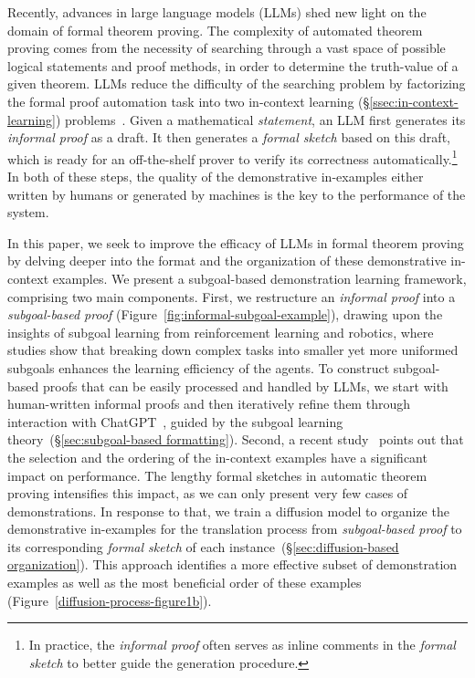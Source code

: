 \documentclass{article}
\begin{document}
Recently, advances in large language models (LLMs) shed new light on the domain of formal theorem proving. The complexity of automated theorem proving comes from the necessity of searching through a vast space of possible logical statements and proof methods, in order to determine the truth-value of a given theorem. LLMs reduce the difficulty of the searching problem by factorizing the formal proof automation task into two in-context learning (\S\ref{ssec:in-context-learning}) problems~\cite{wu2022autoformalization,jiang2022draft,first2023baldur}. Given a mathematical \emph{statement}, an LLM first generates its \emph{informal proof} as a draft. It then generates a \emph{formal sketch} based on this draft, which is ready for an off-the-shelf prover to verify its correctness automatically.\footnote{In practice, the \emph{informal proof} often serves as inline comments in the \emph{formal sketch} to better guide the generation procedure.} In both of these steps, the quality of the demonstrative in-examples either written by humans or generated by machines is the key to the performance of the system.

In this paper, we seek to improve the efficacy of LLMs in formal theorem proving by delving deeper into the format and the organization of these demonstrative in-context examples.  We present a subgoal-based demonstration learning framework, comprising two main components. First, we restructure an \emph{informal proof} into a \emph{subgoal-based proof} (Figure~\ref{fig:informal-subgoal-example}), drawing upon the insights of subgoal learning from reinforcement learning and robotics, where studies show that breaking down complex tasks into smaller yet more uniformed subgoals enhances the learning efficiency of the agents\cite{eysenbach2019search,zhang2021c}. 
To construct subgoal-based proofs that can be easily processed and handled by LLMs, we start with human-written informal proofs and then iteratively refine them through interaction with ChatGPT~\cite{team2022chatgpt}, guided by the subgoal learning theory~(\S\ref{sec:subgoal-based formatting}).
Second, a recent study~\cite{wu2022self} points out that the selection and the ordering of the in-context examples have a significant impact on performance. The lengthy formal sketches in automatic theorem proving intensifies this impact, as we can only present very few cases of demonstrations. In response to that, we train a diffusion model to organize the demonstrative in-examples for the translation process from \emph{subgoal-based proof} to its corresponding \emph{formal sketch} of each instance~(\S\ref{sec:diffusion-based organization}).
This approach identifies a more effective subset of demonstration examples as well as the most beneficial order of these examples (Figure~\ref{diffusion-process-figure1b}). 
\end{document}

